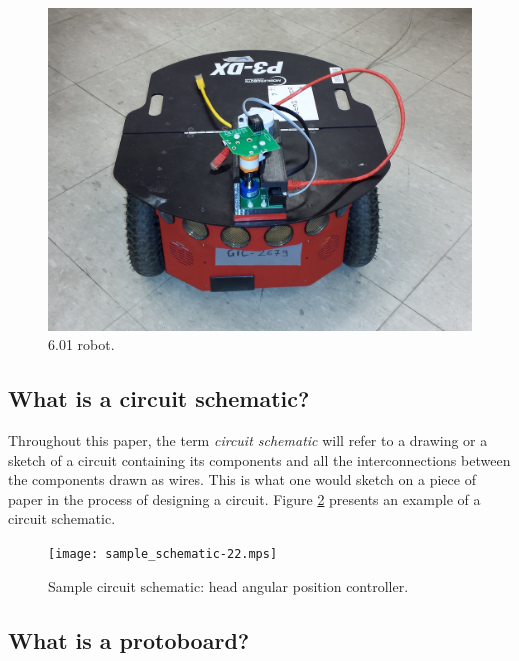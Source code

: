 \begin{figure}
\begin{center}
\includegraphics[width=\textwidth]{Images/robot.jpeg}
\caption{6.01 robot.}
\label{fig:robot}
\end{center}
\end{figure}

\subsection{What is a circuit schematic?}

Throughout this paper, the term \textit{circuit schematic} will refer to a
drawing or a sketch of a circuit containing its components and all the
interconnections between the components drawn as wires. This is what one would
sketch on a piece of paper in the process of designing a circuit. Figure
\ref{fig:schematic} presents an example of a circuit schematic.

\begin{figure}
\begin{center}
\texttt{[image: sample\_schematic-22.mps]}
\caption{Sample circuit schematic: head angular position controller.}
\label{fig:schematic}
\end{center}
\end{figure}

\subsection{What is a protoboard?}
\label{sec:what_is_protoboard}

